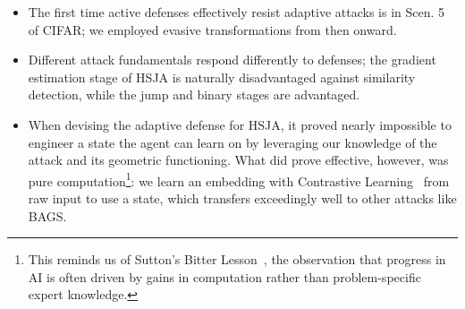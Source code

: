 \begin{itemize}[leftmargin=*]
  \item The first time active defenses effectively resist adaptive attacks is in Scen. 5 of CIFAR; we employed evasive transformations from then onward.
  \item Different attack fundamentals respond differently to defenses; the gradient estimation stage of HSJA is naturally disadvantaged against similarity detection, while the jump and binary stages are advantaged.
  \item When devising the adaptive defense for HSJA, it proved nearly impossible to engineer a state the agent can learn on by leveraging our knowledge of the attack and its geometric functioning. What did prove effective, however, was pure computation\footnote{This reminds us of Sutton's Bitter Lesson~\cite{sutton2019bitter}, the observation that progress in AI is often driven by gains in computation rather than problem-specific expert knowledge.}: we learn an embedding with Contrastive Learning~\cite{hadsell2006dimensionality} from raw input to use a state, which transfers exceedingly well to other attacks like BAGS.
\end{itemize}

